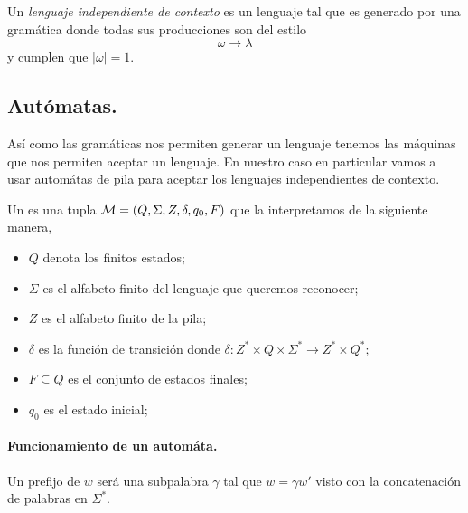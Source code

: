 \documentclass[tesis.tex]{subfiles}
\begin{document}
Un \textit{lenguaje independiente de contexto} es un lenguaje tal que es generado por una gramática donde todas sus producciones son del estilo
\[
 \omega \to \lambda
\]
y cumplen que $|\omega| = 1$. 

\begin{ej}
	
\end{ej}

\subsection{Autómatas.}
Así como las gramáticas nos permiten generar un lenguaje tenemos las máquinas que nos permiten aceptar un lenguaje. En nuestro caso en particular vamos a usar automátas de pila para aceptar los lenguajes independientes de contexto.

\begin{deff}
	Un  es una tupla ${\cal M } = (Q, \Sigma, Z, \delta, q_0, F)$ que la interpretamos de la siguiente manera,
	\begin{itemize}
		\item $Q$ denota los finitos estados;
		\item $\Sigma$ es el alfabeto finito del lenguaje que queremos reconocer;
		\item $Z$ es el alfabeto finito de la pila;
		\item $\delta$ es la función de transición donde $\delta: Z^* \times Q \times \Sigma^* \to Z^* \times Q^*$;
		\item $F \subseteq Q$ es el conjunto de estados finales;
		\item $q_0$ es el estado inicial;
	\end{itemize}
\end{deff}

\paragraph{Funcionamiento de un automáta.}
Un prefijo de $w$ será una subpalabra $\gamma$ tal que $w=\gamma w'$ visto con la concatenación de palabras en $\Sigma^*$.
\end{document}
